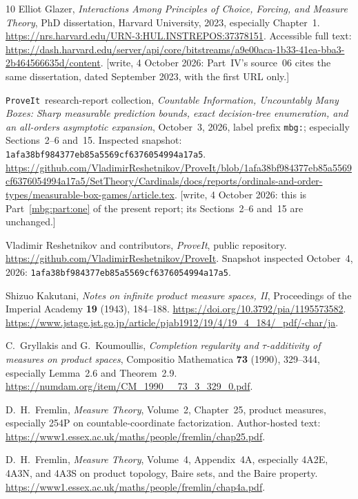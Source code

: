 \documentclass[11pt,letterpaper]{article}
\theoremstyle{definition}
\newcommand{\repo}{\texttt{ProveIt}}
\newcommand{\extsnap}{\nolinkurl{1afa38bf984377eb85a5569cf6376054994a17a5}}
\begin{document}
\begin{thebibliography}{10}
Elliot Glazer,
\emph{Interactions Among Principles of Choice, Forcing, and Measure Theory},
PhD dissertation, Harvard University, 2023, especially Chapter~1.
\url{https://nrs.harvard.edu/URN-3:HUL.INSTREPOS:37378151}.
Accessible full text:
\url{https://dash.harvard.edu/server/api/core/bitstreams/a9e00aca-1b33-41ea-bba3-2b464566635d/content}.
{\small[write, 4 October 2026: Part~IV's source~06 cites the same dissertation, dated September 2023, with the first URL only.]}

\repo\ research-report collection,
\emph{Countable Information, Uncountably Many Boxes: Sharp measurable prediction bounds, exact decision-tree enumeration, and an all-orders asymptotic expansion},
October~3, 2026, label prefix \texttt{mbg:}; especially Sections~2--6 and~15.
Inspected snapshot: \extsnap.
\url{https://github.com/VladimirReshetnikov/ProveIt/blob/1afa38bf984377eb85a5569cf6376054994a17a5/SetTheory/Cardinals/docs/reports/ordinals-and-order-types/measurable-box-games/article.tex}.
{\small[write, 4 October 2026: this is Part~\ref{mbg:part:one} of the present report; its Sections~2--6 and~15 are unchanged.]}

Vladimir Reshetnikov and contributors,
\emph{ProveIt}, public repository.
\url{https://github.com/VladimirReshetnikov/ProveIt}.
Snapshot inspected October~4, 2026: \extsnap.

Shizuo Kakutani,
\emph{Notes on infinite product measure spaces, II},
Proceedings of the Imperial Academy \textbf{19} (1943), 184--188.
\url{https://doi.org/10.3792/pia/1195573582}.
\url{https://www.jstage.jst.go.jp/article/pjab1912/19/4/19_4_184/_pdf/-char/ja}.

C.~Gryllakis and G.~Koumoullis,
\emph{Completion regularity and $\tau$-additivity of measures on product spaces},
Compositio Mathematica \textbf{73} (1990), 329--344,
especially Lemma~2.6 and Theorem~2.9.
\url{https://numdam.org/item/CM_1990__73_3_329_0.pdf}.

D.~H.~Fremlin,
\emph{Measure Theory}, Volume~2, Chapter~25, product measures,
especially 254P on countable-coordinate factorization.
Author-hosted text:
\url{https://www1.essex.ac.uk/maths/people/fremlin/chap25.pdf}.

D.~H.~Fremlin,
\emph{Measure Theory}, Volume~4, Appendix~4A,
especially 4A2E, 4A3N, and 4A3S on product topology, Baire sets, and the Baire property.
\url{https://www1.essex.ac.uk/maths/people/fremlin/chap4a.pdf}.


\end{thebibliography}
\end{document}
